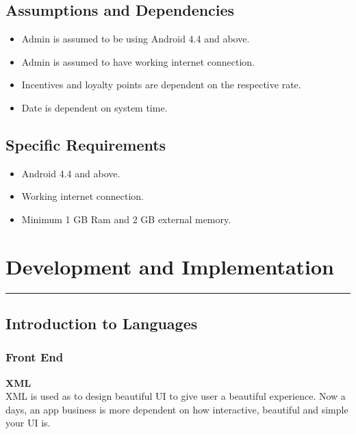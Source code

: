 \section{Assumptions and Dependencies}
\begin{itemize}
	\item Admin is assumed to be using Android 4.4 and above.
	\item Admin is assumed to have working internet connection.
	\item Incentives and loyalty points are dependent on the respective rate.
	\item Date is dependent on system time. 

\end{itemize}
\section{Specific Requirements}
\begin{itemize}
	\item Android 4.4 and above.
	\item Working internet connection.
	\item Minimum 1 GB Ram and 2 GB external memory.
\end{itemize}
\chapter{Development and Implementation}\hrule
\label{Chapter:4}
\section{Introduction to Languages}
\subsection{Front End}
\textbf{XML}\\
XML is used as to design beautiful UI to give user a beautiful experience. Now a days, an app business is more dependent on how interactive, beautiful and simple your UI is.\\

